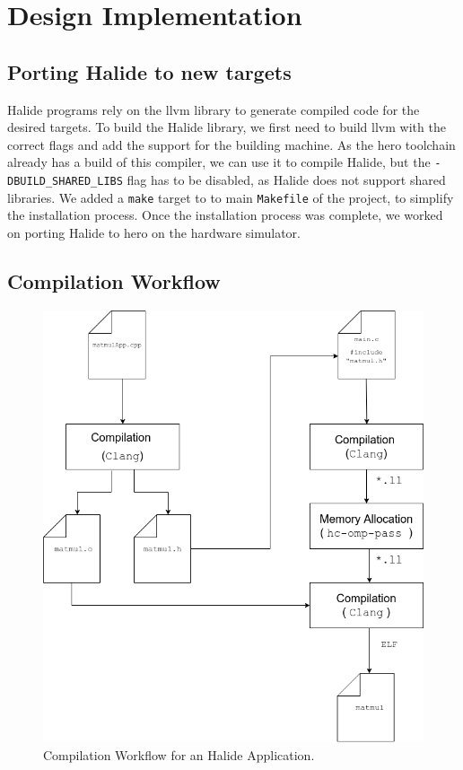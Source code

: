 


\chapter{Design Implementation}


\section { Porting Halide to new targets}
	Halide programs rely on the \gls{llvm} library to generate compiled code for the desired targets. To build the Halide library, we first need to build \gls{llvm} with the correct flags and add the support for the building machine.
	As the \gls{hero} toolchain already has a build of this compiler, we can use it to compile Halide, but the \texttt{-DBUILD\_SHARED\_LIBS} flag has to be disabled, as Halide does not support shared libraries.
	We added a \texttt{make} target to to main \texttt{Makefile} of the project, to simplify the installation process. Once the installation process was complete, we worked on porting Halide to \gls{hero} on the hardware simulator.

	\section{Compilation Workflow}

\begin{figure}[h]
	\centering
	\includegraphics[width=.5\textwidth]{./figures_raw/compilationWorkflow.png}
	\caption{Compilation Workflow for an Halide Application.}
	\label{fig:compwork}
\end{figure}

